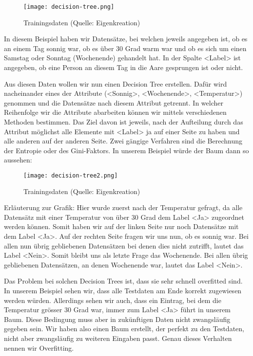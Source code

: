\begin{figure}[h!]
	\centering
	\texttt{[image: decision-tree.png]}
	\caption{Trainingsdaten (Quelle: Eigenkreation)}
\end{figure}

In diesem Beispiel haben wir Datensätze, bei welchen jeweils angegeben ist, ob es an einem Tag sonnig war, ob es über 30 Grad warm war und ob es sich um einen Samstag oder Sonntag (Wochenende) gehandelt hat. In der Spalte <Label> ist angegeben, ob eine Person an diesem Tag in die Aare gesprungen ist oder nicht.

Aus diesen Daten wollen wir nun einen Decision Tree erstellen. Dafür wird nacheinander eines der Attribute (<Sonnig>, <Wochenende>, <Temperatur>) genommen und die Datensätze nach diesem Attribut getrennt. In welcher Reihenfolge wir die Attribute abarbeiten können wir mittels verschiedenen Methoden bestimmen. Das Ziel davon ist jeweils, nach der Aufteilung durch das Attribut möglichst alle Elemente mit <Label> ja auf einer Seite zu haben und alle anderen auf der anderen Seite. Zwei gängige Verfahren sind die Berechnung der Entropie oder des Gini-Faktors. In unserem Beispiel würde der Baum dann so aussehen:
\clearpage
\begin{figure}[h!]
	\centering
	\texttt{[image: decision-tree2.png]}
	\caption{Trainingsdaten (Quelle: Eigenkreation)}
\end{figure}
Erläuterung zur Grafik: Hier wurde zuerst nach der Temperatur gefragt, da alle Datensätz mit einer Temperatur von über 30 Grad dem Label <Ja> zugeordnet werden können. Somit haben wir auf der linken Seite nur noch Datensätze mit dem Label <Ja>. Auf der rechten Seite fragen wir uns nun, ob es sonnig war. Bei allen nun übrig gebliebenen Datensätzen bei denen dies nicht zutrifft, lautet das Label <Nein>. Somit bleibt uns als letzte Frage das Wochenende. Bei allen übrig gebliebenen Datensätzen, an denen Wochenende war, lautet das Label <Nein>.

Das Problem bei solchen Decision Trees ist, dass sie sehr schnell overfitted sind. In unserem Beispiel sehen wir, dass alle Testdaten am Ende korrekt zugewiesen werden würden. Allerdings sehen wir auch, dass ein Eintrag, bei dem die Temperatur grösser 30 Grad war, immer zum Label <Ja> führt in unserem Baum. Diese Bedingung muss aber in zukünftigen Daten nicht zwangsläufig gegeben sein. Wir haben also einen Baum erstellt, der perfekt zu den Testdaten, nicht aber zwangsläufig zu weiteren Eingaben passt. Genau dieses Verhalten nennen wir Overfitting.


